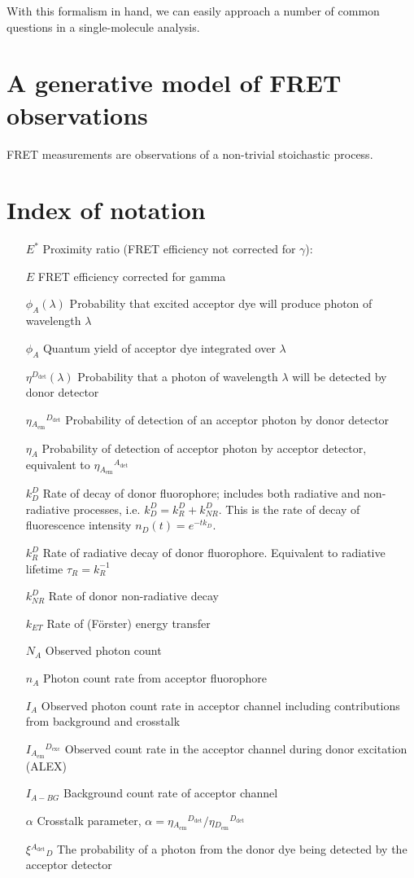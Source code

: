\documentclass{article}
\newcommand{\emm}[1]{\ensuremath{_{#1_\mathrm{em}}}}   %
\newcommand{\exc}[1]{\ensuremath{^{#1_\mathrm{exc}}}}  %
\newcommand{\dt}[1]{\ensuremath{^{#1_\mathrm{det}}}}   %
\newcommand{\NR}{\ensuremath{\mathit{NR}}}          %
\newcommand{\ET}{\ensuremath{\mathit{ET}}}          %
\begin{document}
With this formalism in hand, we can easily approach a number of common
questions in a single-molecule analysis.


\section{A generative model of FRET observations}

FRET measurements are observations of a non-trivial stoichastic process.

\section{Index of notation}

\begin{enumerate}
\item[$E^*$] Proximity ratio (FRET efficiency not corrected for $\gamma$):
\item[$E$] FRET efficiency corrected for gamma
\item[$\phi_{A}(\lambda)$] Probability that excited acceptor dye will produce photon of wavelength $\lambda$
\item[$\phi_{A}$] Quantum yield of acceptor dye integrated over $\lambda$
\item[$\eta\dt{D}(\lambda)$] Probability that a photon of wavelength $\lambda$ will be detected by donor detector
\item[$\eta\emm{A}\dt{D}$] Probability of detection of an acceptor photon by donor detector
\item[$\eta_A$] Probability of detection of acceptor photon by acceptor detector, equivalent to $\eta\emm{A}\dt{A}$
\item[$k^D_D$] Rate of decay of donor fluorophore; includes both radiative and non-radiative processes, i.e. $k^D_D = k^D_R + k^D_\NR$. This is the rate of decay of fluorescence intensity $n_D(t) = e^{-t k_D}$.
\item[$k^D_R$] Rate of radiative decay of donor fluorophore. Equivalent to radiative lifetime $\tau_R = k_R^{-1}$
\item[$k^D_\NR$] Rate of donor non-radiative decay
\item[$k_\ET$] Rate of (F\"orster) energy transfer
\item[$N_A$] Observed photon count
\item[$n_A$] Photon count rate from acceptor fluorophore
\item[$I_A$] Observed photon count rate in acceptor channel including contributions from background and crosstalk
\item[$I\emm{A}\exc{D}$] Observed count rate in the acceptor channel during donor excitation (ALEX)
\item[$I_{A-BG}$] Background count rate of acceptor channel
\item[$\alpha$] Crosstalk parameter, $\alpha = \eta\emm{A}\dt{D} / \eta\emm{D}\dt{D}$
\item[$\xi\dt{A}_D$] The probability of a photon from the donor dye being detected by the acceptor detector
\end{enumerate}
\end{document}
